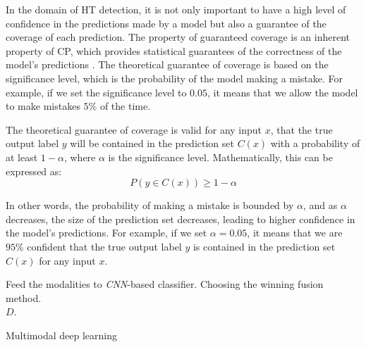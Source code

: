 In the domain of HT detection, it is not only important to have a high level of confidence in the predictions made by a model but also a guarantee of the coverage of each prediction. The property of guaranteed coverage is an inherent property of CP, which provides statistical guarantees of the correctness of the model's predictions \cite{angelopoulos2023conformal}. The theoretical guarantee of coverage is based on the significance level, which is the probability of the model making a mistake. For example, if we set the significance level to $0.05$, it means that we allow the model to make mistakes $5\%$ of the time.
 
The theoretical guarantee of coverage is valid for any input $x$, that the true output label $y$ will be contained in the prediction set $C(x)$ with a probability of at least $1 - \alpha$, where $\alpha$ is the significance level. Mathematically, this can be expressed as:
\begin{equation}
P(y \in C(x)) \geq 1 - \alpha
\end{equation}

In other words, the probability of making a mistake is bounded by $\alpha$, and as $\alpha$ decreases, the size of the prediction set decreases, leading to higher confidence in the model's predictions. For example, if we set $\alpha = 0.05$, it means that we are $95\%$ confident that the true output label $y$ is contained in the prediction set $C(x)$ for any input $x$.

\begin{algorithm}[!b]
\small
{}
Feed the modalities to \textit{CNN}-based classifier.
\newline 
{}
Choosing the winning fusion method.\\
\Return $D$.
\caption{Multimodal deep learning}
\label{algo:mdd}
\end{algorithm}

